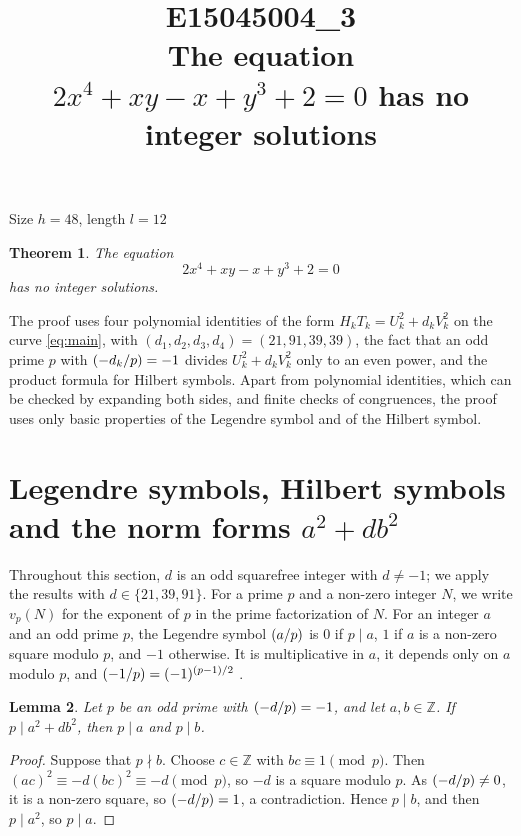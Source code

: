 \documentclass[11pt]{article}
\title{\textbf{E15045004\_3}\\[4pt] {\Large The equation $2x^{4}+xy-x+y^{3}+2=0$ has no integer solutions}}
\author{}
\date{}
\newtheorem{theorem}{Theorem}
\newtheorem{lemma}[theorem]{Lemma}
\newcommand{\Z}{\mathbb{Z}}
\newcommand{\leg}[2]{\mathchoice{\biggl(\dfrac{#1}{#2}\biggr)}{(#1/#2)}{(#1/#2)}{(#1/#2)}}
\begin{document}
\maketitle
\vspace{-8ex}
\begin{center}
Size $h=48$, length $l=12$
\end{center}

\begin{theorem}\label{thm:main}
The equation
\begin{equation}\label{eq:main}
2x^{4}+xy-x+y^{3}+2=0
\end{equation}
has no integer solutions.
\end{theorem}

The proof uses four polynomial identities of the form $H_kT_k=U_k^2+d_kV_k^2$ on the curve \eqref{eq:main}, with $(d_{1},d_{2},d_{3},d_{4})=(21,91,39,39)$, the fact that an odd prime $p$ with $\leg{-d_k}{p}=-1$ divides $U_k^2+d_kV_k^2$ only to an even power, and the product formula for Hilbert symbols. Apart from polynomial identities, which can be checked by expanding both sides, and finite checks of congruences, the proof uses only basic properties of the Legendre symbol and of the Hilbert symbol.

\section{Legendre symbols, Hilbert symbols and the norm forms $a^2+db^2$}

Throughout this section, $d$ is an odd squarefree integer with $d\neq-1$; we apply the results with $d\in\{21,39,91\}$. For a prime $p$ and a non-zero integer $N$, we write $v_p(N)$ for the exponent of $p$ in the prime factorization of $N$. For an integer $a$ and an odd prime $p$, the Legendre symbol $\leg{a}{p}$ is $0$ if $p\mid a$, $1$ if $a$ is a non-zero square modulo $p$, and $-1$ otherwise. It is multiplicative in $a$, it depends only on $a$ modulo $p$, and $\leg{-1}{p}=(-1)^{(p-1)/2}$ \cite[Chapter~5]{IR}.

\begin{lemma}\label{lem:divides}
Let $p$ be an odd prime with $\leg{-d}{p}=-1$, and let $a,b\in\Z$. If $p\mid a^2+db^2$, then $p\mid a$ and $p\mid b$.
\end{lemma}

\begin{proof}
Suppose that $p\nmid b$. Choose $c\in\Z$ with $bc\equiv1\pmod p$. Then $(ac)^2\equiv-d(bc)^2\equiv-d\pmod p$, so $-d$ is a square modulo $p$. As $\leg{-d}{p}\neq0$, it is a non-zero square, so $\leg{-d}{p}=1$, a contradiction. Hence $p\mid b$, and then $p\mid a^2$, so $p\mid a$.
\end{proof}
\end{document}
